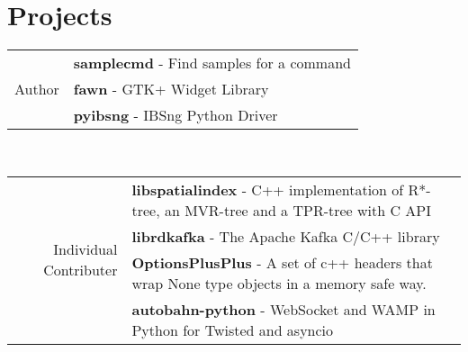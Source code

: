 \documentclass[a4paper,11pt]{article}
\begin{document}
\section{Projects}
\begin{tabular}{r|p{11cm}}

    \multirow{3}{*}{\hspace{2.75cm}Author}
    & \textbf{samplecmd} - Find samples for a command\\
    & \textbf{fawn} - GTK+ Widget Library\\
    & \textbf{pyibsng} - IBSng Python Driver\\

\end{tabular}\\

\begin{tabular}{r|p{11cm}}

    \multirow{4}{*}{Individual Contributer}
    & \textbf{libspatialindex} - C++ implementation of R*-tree, an MVR-tree and a TPR-tree with C API\\
    & \textbf{librdkafka} - The Apache Kafka C/C++ library\\
    & \textbf{OptionsPlusPlus} - A set of c++ headers that wrap None type objects in a memory safe way.\\
    & \textbf{autobahn-python} - WebSocket and WAMP in Python for Twisted and asyncio\\

\end{tabular}\\

\end{document}
